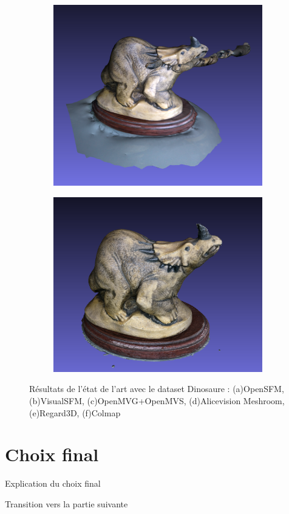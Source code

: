\begin{figure}[ht]
    \begin{subfigure}{0.45\textwidth}
        \includegraphics[width=\linewidth]{datas/state_of_the_art/regard3d_result_dino.png}
        \caption{}
    \end{subfigure}
    \begin{subfigure}{0.45\textwidth}
        \includegraphics[width=\linewidth]{datas/state_of_the_art/colmap_result_dino.png}
        \caption{}
    \end{subfigure}

    \caption{Résultats de l'état de l'art avec le dataset Dinosaure : (a)OpenSFM, (b)VisualSFM, (c)OpenMVG+OpenMVS, (d)Alicevision Meshroom, (e)Regard3D, (f)Colmap}
    \label{fig:result_sota}
\end{figure}

\section{Choix final}

Explication du choix final

Transition vers la partie suivante